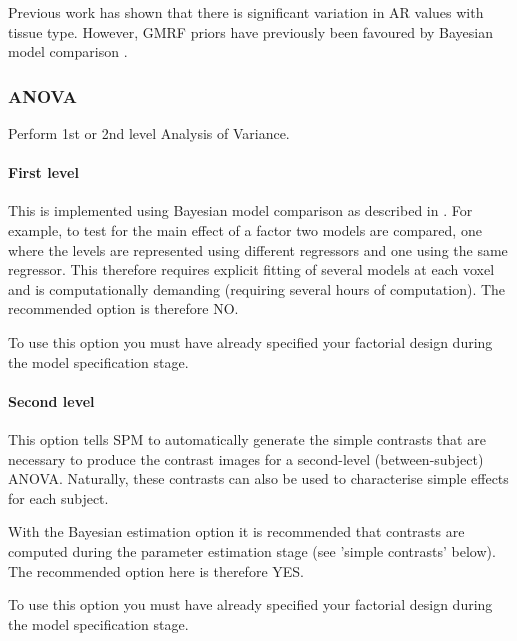 \documentclass[a4paper,titlepage]{book}
\begin{document}
Previous work has shown that there is significant variation in AR values with tissue type. However, GMRF priors have previously been favoured by Bayesian model comparison \cite{vb4}.


\subsubsection{ANOVA}
Perform 1st or 2nd level Analysis of Variance.


\paragraph{First level}
This is implemented using Bayesian model comparison as described in 
\cite{vb4}. For example, to test for the main effect of a factor two models are compared, one where the levels are represented using different regressors and one using the same regressor. This therefore requires explicit fitting of several models at each voxel and is computationally demanding (requiring several hours of computation). The recommended option is therefore NO.

                                                                                                            

To use this option you must have already specified your factorial design during the model specification stage. 


\paragraph{Second level}
This option tells SPM to automatically generate the simple contrasts that are necessary to produce the contrast images for a second-level (between-subject) ANOVA. Naturally, these contrasts can also be used to characterise simple effects for each subject. 

                                                                                                            

With the Bayesian estimation option it is recommended that contrasts are computed during the parameter estimation stage (see 'simple contrasts' below). The recommended option here is therefore YES.

                                                                                                            

To use this option you must have already specified your factorial design during the model specification stage. 
\end{document}
